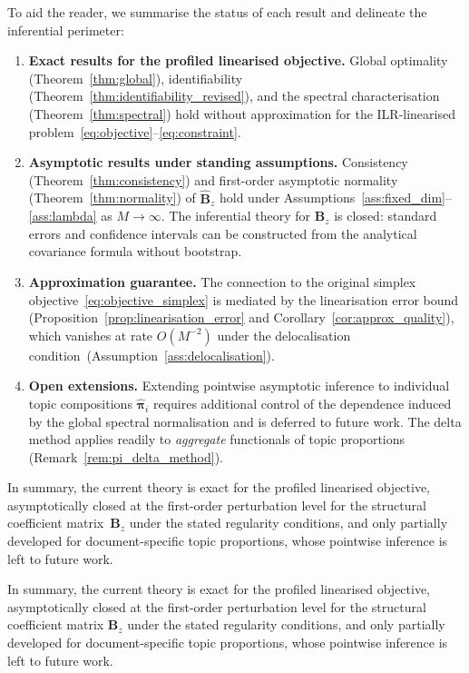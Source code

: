 To aid the reader, we summarise the status of each result and
delineate the inferential perimeter:
%
\begin{enumerate}
  \item \textbf{Exact results for the profiled linearised objective.}
    Global optimality (Theorem~\ref{thm:global}),
    identifiability (Theorem~\ref{thm:identifiability_revised}), and
    the spectral characterisation (Theorem~\ref{thm:spectral})
    hold without approximation for the ILR-linearised
    problem~\eqref{eq:objective}--\eqref{eq:constraint}.

  \item \textbf{Asymptotic results under standing assumptions.}
    Consistency (Theorem~\ref{thm:consistency}) and first-order
    asymptotic normality (Theorem~\ref{thm:normality}) of
    $\hat{\mathbf{B}}_z$ hold under
    Assumptions~\ref{ass:fixed_dim}--\ref{ass:lambda} as
    $M\to\infty$. The inferential theory for $\mathbf{B}_z$ is
    closed: standard errors and confidence intervals can be
    constructed from the analytical covariance formula without
    bootstrap.

  \item \textbf{Approximation guarantee.}
    The connection to the original simplex
    objective~\eqref{eq:objective_simplex} is mediated by the
    linearisation error bound
    (Proposition~\ref{prop:linearisation_error} and
    Corollary~\ref{cor:approx_quality}), which vanishes at rate
    $O(M^{-2})$ under the delocalisation
    condition~(Assumption~\ref{ass:delocalisation}).

  \item \textbf{Open extensions.}
    Extending pointwise asymptotic inference to individual topic
    compositions $\hat{\boldsymbol{\pi}}_i$ requires additional
    control of the dependence induced by the global spectral
    normalisation and is deferred to future work.
    The delta method applies readily to \emph{aggregate} functionals
    of topic proportions (Remark~\ref{rem:pi_delta_method}).
\end{enumerate}

\noindent
In summary, the current theory is exact for the profiled linearised
objective, asymptotically closed at the first-order perturbation level
for the structural coefficient matrix~$\mathbf{B}_z$ under the stated
regularity conditions, and only partially developed for
document-specific topic proportions, whose pointwise inference is left
to future work.

\noindent
In summary, the current theory is exact for the profiled linearised
objective, asymptotically closed at the first-order perturbation level
for the structural coefficient matrix $\mathbf{B}_z$ under the stated
regularity conditions, and only partially developed for
document-specific topic proportions, whose pointwise inference is left
to future work.


